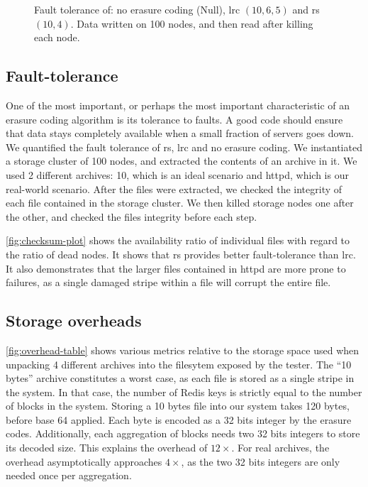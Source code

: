 \begin{figure}
    \centering
    
    \caption{Fault tolerance of: no erasure coding (Null), \acl{lrc} $\left(10,6,5\right)$ and \acl{rs} $\left(10,4\right)$. Data written on 100 nodes, and then read after killing each node.}
    \label{fig:checksum-plot}
\end{figure}

\subsection{Fault-tolerance}
\label{subsec:fault-tolerance}

One of the most important, or perhaps the most important characteristic of an erasure coding algorithm is its tolerance to faults.
A good code should ensure that data stays completely available when a small fraction of servers goes down.
We quantified the fault tolerance of \acf{rs}, \acf{lrc} and no erasure coding.
We instantiated a storage cluster of 100 nodes, and extracted the contents of an archive in it.
We used 2 different archives: \SI{10}{\byte}, which is an ideal scenario and httpd, which is our real-world scenario.
After the files were extracted, we checked the integrity of each file contained in the storage cluster.
We then killed storage nodes one after the other, and checked the files integrity before each step.

\autoref{fig:checksum-plot} shows the availability ratio of individual files with regard to the ratio of dead nodes.
It shows that \ac{rs} provides better fault-tolerance than \ac{lrc}.
It also demonstrates that the larger files contained in httpd are more prone to failures, as a single damaged stripe within a file will corrupt the entire file.



\subsection{Storage overheads}
\label{subsec:storage-overheads}

\autoref{fig:overhead-table} shows various metrics relative to the storage space used when unpacking 4 different archives into the filesytem exposed by the tester.
The \enquote{10 bytes} archive constitutes a worst case, as each file is stored as a single stripe in the system.
In that case, the number of Redis keys is strictly equal to the number of blocks in the system.
Storing a 10 bytes file into our system takes 120 bytes, before base 64 applied.
Each byte is encoded as a 32 bits integer by the erasure codes.
Additionally, each aggregation of blocks needs two 32 bits integers to store its decoded size.
This explains the overhead of $12\times$.
For real archives, the overhead asymptotically approaches $4\times$, as the two 32 bits integers are only needed once per aggregation.

